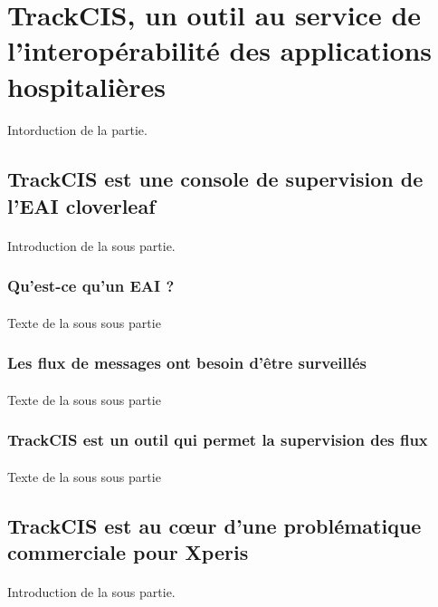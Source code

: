 \section{TrackCIS, un outil au service de l'interopérabilité des applications hospitalières}
	\paragraph{}
	Intorduction de la partie.

	\subsection{TrackCIS est une console de supervision de l'EAI cloverleaf}
		\paragraph{}
		Introduction de la sous partie.
		
		\subsubsection{Qu'est-ce qu'un EAI ?}
			\paragraph{}
			Texte de la sous sous partie
		\subsubsection{Les flux de messages ont besoin d'être surveillés}
			\paragraph{}
			Texte de la sous sous partie
		\subsubsection{TrackCIS est un outil qui permet la supervision des flux}
			\paragraph{}
			Texte de la sous sous partie
	
	\subsection{TrackCIS est au cœur d'une problématique commerciale pour Xperis}
		\paragraph{}
		Introduction de la sous partie.
		
